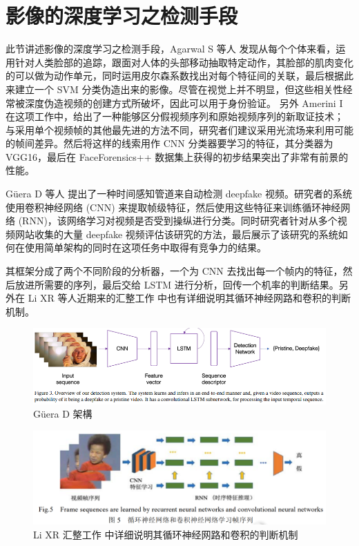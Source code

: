 \section{影像的深度学习之检测手段}

此节讲述影像的深度学习之检测手段，Agarwal S 等人 \cite{agarwal2019protecting} 发现从每个个体来看，运用针对人类脸部的追踪，跟面对人体的头部移动抽取特定动作，其脸部的肌肉变化的可以做为动作单元，同时运用皮尔森系数找出对每个特征间的关联，最后根据此来建立一个 SVM 分类伪造出来的影像。尽管在视觉上并不明显，但这些相关性经常被深度伪造视频的创建方式所破坏，因此可以用于身份验证。
另外 Amerini I \cite{amerini2019deepfake} 在这项工作中，给出了一种能够区分假视频序列和原始视频序列的新取证技术； 与采用单个视频帧的其他最先进的方法不同，研究者们建议采用光流场来利用可能的帧间差异。然后将这样的线索用作 CNN 分类器要学习的特征，其分类器为 VGG16，最后在 FaceForensics++ 数据集上获得的初步结果突出了非常有前景的性能。

Güera D 等人\cite{guera2018deepfake} 提出了一种时间感知管道来自动检测 deepfake 视频。研究者的系统使用卷积神经网络 (CNN) 来提取帧级特征，然后使用这些特征来训练循环神经网络 (RNN)，该网络学习对视频是否受到操纵进行分类。同时研究者针对从多个视频网站收集的大量 deepfake 视频评估该研究的方法，最后展示了该研究的系统如何在使用简单架构的同时在这项任务中取得有竞争力的结果。

其框架分成了两个不同阶段的分析器，一个为 CNN 去找出每一个帧内的特征，然后放进所需要的序列，最后交给 LSTM 进行分析，回传一个机率的判断结果。另外在 Li XR 等人近期来的汇整工作\cite{2021496} 中也有详细说明其循环神经网路和卷积的判断机制。

\begin{figure}[htb]
\centering 
\includegraphics[width=1.05\textwidth]{img/ch3m15.png} 
\caption{Güera D \cite{guera2018deepfake} 架構}
\label{Test}
\end{figure}

\begin{figure}[htb]
\centering 
\includegraphics[width=1.05\textwidth]{img/ch3m16.png} 
\caption{Li XR 汇整工作\cite{2021496} 中详细说明其循环神经网路和卷积的判断机制}
\label{Test}
\end{figure}

